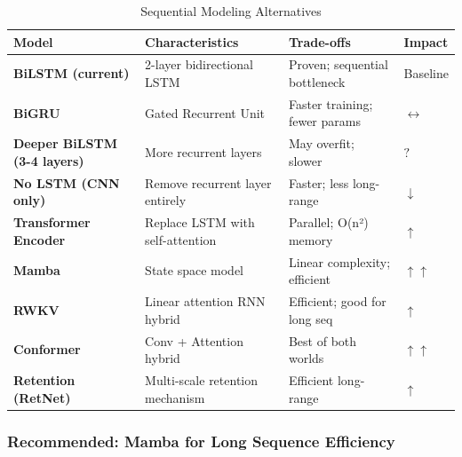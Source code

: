 \documentclass[11pt,a4paper]{article}
\begin{document}
\begin{longtable}{L{2.5cm}L{4cm}L{4cm}C{1.5cm}}
\caption{Sequential Modeling Alternatives} \\
\toprule
\textbf{Model} & \textbf{Characteristics} & \textbf{Trade-offs} & \textbf{Impact} \\
\midrule
\endfirsthead
\bottomrule
\endlastfoot

\textbf{BiLSTM (current)} & 2-layer bidirectional LSTM & Proven; sequential bottleneck & Baseline \\

\textbf{BiGRU} & Gated Recurrent Unit & Faster training; fewer params & \textcolor{neutral}{$\leftrightarrow$} \\

\textbf{Deeper BiLSTM (3-4 layers)} & More recurrent layers & May overfit; slower & \textcolor{uncertain}{$?$} \\

\textbf{No LSTM (CNN only)} & Remove recurrent layer entirely & Faster; less long-range & \textcolor{negative}{$\downarrow$} \\

\textbf{Transformer Encoder} & Replace LSTM with self-attention & Parallel; O(n²) memory & \textcolor{positive}{$\uparrow$} \\

\textbf{Mamba} & State space model & Linear complexity; efficient & \textcolor{positive}{$\uparrow\uparrow$} \\

\textbf{RWKV} & Linear attention RNN hybrid & Efficient; good for long seq & \textcolor{positive}{$\uparrow$} \\

\textbf{Conformer} & Conv + Attention hybrid & Best of both worlds & \textcolor{positive}{$\uparrow\uparrow$} \\

\textbf{Retention (RetNet)} & Multi-scale retention mechanism & Efficient long-range & \textcolor{positive}{$\uparrow$} \\

\end{longtable}

\subsubsection{Recommended: Mamba for Long Sequence Efficiency}
\end{document}
